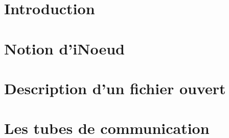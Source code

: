 %
\section{Introduction}

%
\section{Notion d'iNoeud}

%
\section{Description d'un fichier ouvert}

%
\section{Les tubes de communication}
